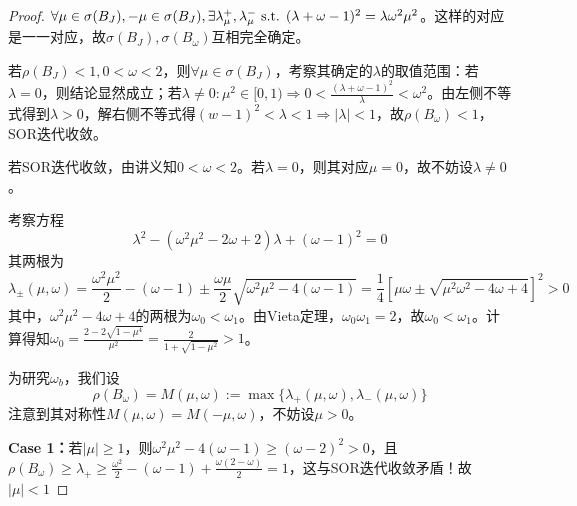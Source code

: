 \documentclass{ctexart}
\begin{document}
\begin{proof}
$\forall \mu\in\sigma(B_J),-\mu\in\sigma(B_J),\exists \lambda_\mu^+,\lambda_\mu^-\text{ s.t. } (\lambda+\omega-1)^2=\lambda\omega^2\mu^2$。这样的对应是一一对应，故$\sigma(B_J),\sigma(B_\omega)$互相完全确定。

若$\rho(B_J)<1,0<\omega<2$，则$\forall\mu\in\sigma(B_J)$，考察其确定的$\lambda$的取值范围：若$\lambda=0$，则结论显然成立；若$\lambda\neq 0:\mu^2\in[0,1)\Rightarrow 0<\frac{(\lambda+\omega-1)^2}{\lambda}<\omega^2$。由左侧不等式得到$\lambda>0$，解右侧不等式得$(w-1)^2<\lambda<1\Rightarrow |\lambda|<1$，故$\rho(B_\omega)<1$，SOR迭代收敛。

若SOR迭代收敛，由讲义知$0<\omega<2$。若$\lambda=0$，则其对应$\mu=0$，故不妨设$\lambda\neq 0$。



考察方程
\[\lambda^2-(\omega^2\mu^2-2\omega+2)\lambda+(\omega-1)^2=0\]
其两根为
\[\lambda_\pm(\mu,\omega)=\frac{\omega^2\mu^2}{2}-(\omega-1)\pm\frac{\omega\mu}{2}\sqrt{\omega^2\mu^2-4(\omega-1)}=\frac{1}{4}[\mu\omega\pm\sqrt{\mu^2\omega^2-4\omega+4}]^2>0\]
其中，$\omega^2\mu^2-4\omega+4$的两根为$\omega_0<\omega_1$。由Vieta定理，$\omega_0\omega_1=2$，故$\omega_0<\omega_1$。计算得知$\omega_0=\frac{2-2\sqrt{1-\mu^4}}{\mu^2}=\frac{2}{1+\sqrt{1-\mu^2}}>1$。

为研究$\omega_b$，我们设
\[\rho(B_\omega)=M(\mu,\omega):=\max\{\lambda_+(\mu,\omega),\lambda_-(\mu,\omega)\}\]
注意到其对称性$M(\mu,\omega)=M(-\mu,\omega)$，不妨设$\mu>0$。

\textbf{Case 1：}若$|\mu|\geq 1$，则$\omega^2\mu^2-4(\omega-1)\geq (\omega-2)^2>0$，且$\rho(B_\omega)\geq\lambda_+\geq \frac{\omega^2}{2}-(\omega-1)+\frac{\omega(2-\omega)}{2}=1$，这与SOR迭代收敛矛盾！故$|\mu|<1$


\end{proof}
\end{document}
